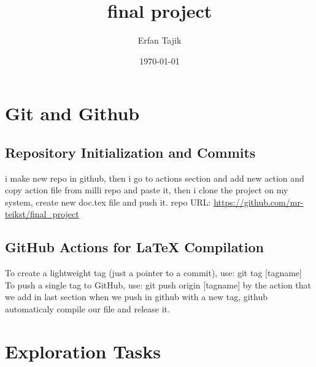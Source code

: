 \documentclass [ titlepage ]{article}
\title{final project}
\author{Erfan Tajik}
\date{\today}
\begin{document}
\maketitle

\tableofcontents
\newpage

\section{Git and Github}
\subsection{ Repository Initialization and Commits}
i make new repo in github, then i go to actions section and add new action and copy action file from milli repo and paste it,
then i clone the project on my system, create new doc.tex file and push it. \newline
repo URL: \url{https://github.com/mr-teikst/final_project} 

\subsection{GitHub Actions for LaTeX Compilation}
To create a lightweight tag (just a pointer to a commit), use: \newline
\textdollar git tag [tagname] \newline 
To push a single tag to GitHub, use: \newline
\textdollar git push origin [tagname] \newline
by the action that we add in last section when we push in github with a new tag, github automaticaly compile our file and release it.


\section{Exploration Tasks}
\end{document}
